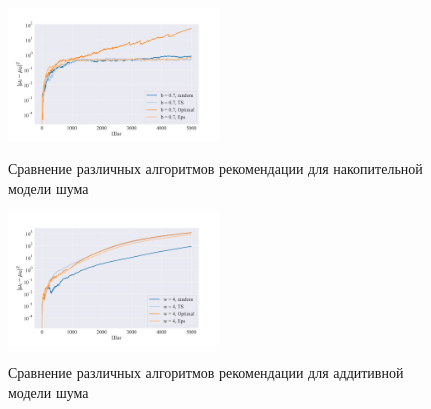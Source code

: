 \documentclass[12pt, twoside]{article}
\begin{document}
\begin{figure}[h]
  \begin{multicols}{2}
    \hfill
    \includegraphics[width=0.5\textwidth]{../figures/compare_model_b.pdf}
    \hfill
    \caption{Сравнение различных алгоритмов рекомендации для накопительной модели шума}
    \label{fig8}
    \hfill
    \includegraphics[width=0.5\textwidth]{../figures/compare_models_w.pdf}
    \hfill
    \caption{Сравнение различных алгоритмов рекомендации для аддитивной модели шума}
    \label{fig9}
  \end{multicols}
\end{figure}
\end{document}
